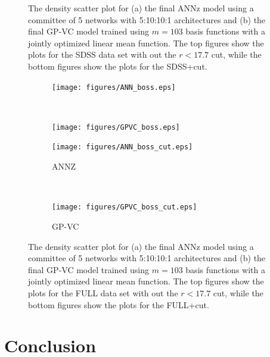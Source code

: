 \documentclass[useAMS,usenatbib,fleqn]{mn2e}
\begin{document}
\begin{figure}
        
       \caption{The density scatter plot for (a) the final {\sc ANNz} model using a committee of 5 networks with 5:10:10:1 architectures and (b) the final GP-VC model trained using $m=103$ basis functions with a jointly optimized linear mean function. The top figures show the plots for the SDSS data set with out the $r<17.7$ cut, while the bottom figures show the plots for the SDSS+cut.}
       \label{fig-final-model-sdss}
\end{figure}

\begin{figure}
        \centering
       

        \begin{subfigure}[b]{0.35\textwidth}
                \texttt{[image: figures/ANN\_boss.eps]}
        \end{subfigure}
        ~ 
        \begin{subfigure}[b]{0.35\textwidth}
                \texttt{[image: figures/GPVC\_boss.eps]}
        \end{subfigure}
        

        \begin{subfigure}[b]{0.35\textwidth}
                \texttt{[image: figures/ANN\_boss\_cut.eps]}
        \caption{{\sc ANNZ}}
        \end{subfigure}
        ~ 
        \begin{subfigure}[b]{0.35\textwidth}
                \texttt{[image: figures/GPVC\_boss\_cut.eps]}
        \caption{GP-VC}
        \end{subfigure}
        
       \caption{The density scatter plot for (a) the final {\sc ANNz} model using a committee of 5 networks with 5:10:10:1 architectures and (b) the final GP-VC model trained using $m=103$ basis functions with a jointly optimized linear mean function. The top figures show the plots for the FULL data set with out the $r<17.7$ cut, while the bottom figures show the plots for the FULL+cut. }
       \label{fig-final-model-boss}
\end{figure}

\section{Conclusion}
\label{sec-conclusion}
\end{document}
